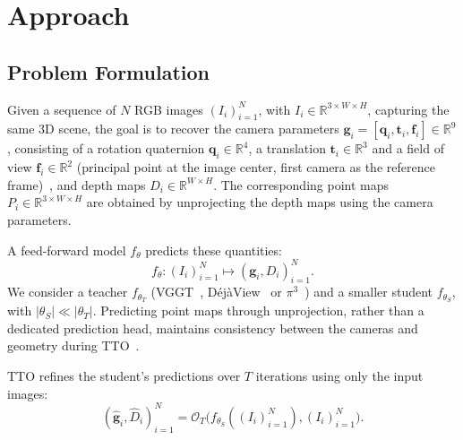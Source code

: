 \section{Approach}
\label{sec:approach}

\subsection{Problem Formulation}

Given a sequence of $N$ RGB images $(I_i)_{i=1}^N$, with
$I_i \in \mathbb{R}^{3 \times W \times H}$, capturing the same 3D scene, the goal is to recover the camera parameters $\mathbf{g}_i = [\mathbf{q}_i, \mathbf{t}_i, \mathbf{f}_i] \in \mathbb{R}^9$, consisting of a rotation quaternion $\mathbf{q}_i \in \mathbb{R}^4$, a translation $\mathbf{t}_i \in \mathbb{R}^3$ and a field of view $\mathbf{f}_i \in \mathbb{R}^2$ (principal point at the image center, first camera as the reference frame)~\cite{vggt}, and depth maps $D_i \in \mathbb{R}^{W \times H}$. The corresponding point maps $P_i \in \mathbb{R}^{3 \times W \times H}$ are obtained by unprojecting the depth maps using the camera parameters.

A feed-forward model $f_\theta$ predicts these quantities:
\[
f_\theta : (I_i)_{i=1}^N
\mapsto (\mathbf{g}_i, D_i)_{i=1}^N.
\]
We consider a teacher $f_{\theta_T}$ (VGGT~\cite{vggt}, DéjàView~\cite{dejaview} or $\pi^3$~\cite{pi3}) and a smaller student $f_{\theta_S}$, with $|\theta_S| \ll |\theta_T|$. Predicting point maps through unprojection, rather than a dedicated prediction head, maintains consistency between the cameras and geometry during TTO~\cite{vggt}.

TTO refines the student's predictions over $T$ iterations using only the input images:
\[
(\hat{\mathbf{g}}_i,\hat{D}_i)_{i=1}^N
= \mathcal{O}_T\big(f_{\theta_S}((I_i)_{i=1}^N),
(I_i)_{i=1}^N\big).
\]

